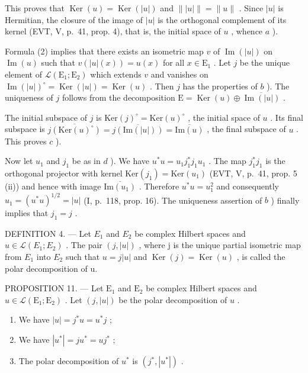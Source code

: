 This proves that \(\operatorname{Ker}(u) = \operatorname{Ker}(|u|)\) and \(\| |u| \| = \|u\|\) . Since \(|u|\) is Hermitian, the closure of the image of \(|u|\) is the orthogonal complement of its kernel (EVT, V, p.~41, prop. 4), that is, the initial space of \(u\) , whence \(a\) ).

Formula (2) implies that there exists an isometric map \(v\) of \(\operatorname{Im}(|u|)\) on \(\operatorname{Im}(u)\) such that \(v(|u|(x)) = u(x)\) for all \(x \in \mathrm{E}_1\) . Let \(j\) be the unique element of \(\mathcal{L}(\mathrm{E}_1; \mathrm{E}_2)\) which extends \(v\) and vanishes on \(\operatorname{Im}(|u|)^{\circ} = \operatorname{Ker}(|u|) = \operatorname{Ker}(u)\) . Then \(j\) has the properties of \(b\) ). The uniqueness of \(j\) follows from the decomposition \(\mathrm{E} = \operatorname{Ker}(u) \oplus \overline{\operatorname{Im}(|u|)}\) .

The initial subspace of \(j\) is \(\mathrm{Ker}(j)^{\circ} = \mathrm{Ker}(u)^{\circ}\) , the initial space of \(u\) . Its final subspace is \(\overline{j(\mathrm{Ker}(u)^{\circ})} = \overline{j(\mathrm{Im}(|u|))} = \overline{\mathrm{Im}(u)}\) , the final subspace of \(u\) . This proves \(c\) ).

Now let \(u_1\) and \(j_1\) be as in \(d\) ). We have \(u^*u = u_1j_1^*j_1u_1\) . The map \(j_1^*j_1\) is the orthogonal projector with kernel \(\text{Ker}(j_1) = \text{Ker}(u_1)\) (EVT, V, p.~41, prop. 5 (ii)) and hence with image \(\overline{\text{Im}(u_1)}\) . Therefore \(u^*u = u_1^2\) and consequently \(u_1 = (u^*u)^{1/2} = |u|\) (I, p.~118, prop. 16). The uniqueness assertion of \(b\) ) finally implies that \(j_1 = j\) .

DEFINITION 4. --- Let \(E_{1}\) and \(E_{2}\) be complex Hilbert spaces and \(u \in \mathcal{L}(E_{1}; E_{2})\) . The pair \((j, |u|)\) , where j is the unique partial isometric map from \(E_{1}\) into \(E_{2}\) such that \(u = j|u|\) and \(\operatorname{Ker}(j) = \operatorname{Ker}(u)\) , is called the polar decomposition of u.

PROPOSITION 11. — Let \(\mathrm{E}_1\) and \(\mathrm{E}_2\) be complex Hilbert spaces and \(u \in \mathcal{L}(\mathrm{E}_1; \mathrm{E}_2)\) . Let \((j, |u|)\) be the polar decomposition of \(u\) .

\begin{enumerate}
\def\labelenumi{\alph{enumi})}
\item
  We have \(|u| = j^{*}u = u^{*}j\) ;
\item
  We have \(|u^{*}| = j u^{*} = u j^{*}\) ;
\item
  The polar decomposition of \(u^{*}\) is \((j^{*}, |u^{*}|)\) .
\end{enumerate}

